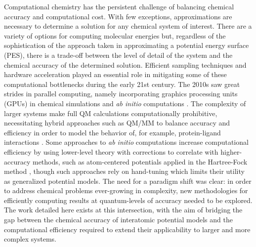 Computational chemistry has the persistent challenge of balancing chemical accuracy and computational cost. 
With few exceptions, approximations are necessary to determine a solution for any chemical system of interest. 
There are a variety of options for computing molecular energies but, regardless of the sophistication of the approach taken in approximating a potential energy surface (PES), there is a trade-off between the level of detail of the system and the chemical accuracy of the determined solution.
Efficient sampling techniques \cite{remd_adrian1, remd_adrian2, remd_umbrella} 
and hardware acceleration \cite{gpu_dft, gpu_quantum_chem1, gpu_quantum_chem2} 
played an essential role in mitigating some of these computational bottlenecks during the early 21st century.
The 2010s saw great strides in parallel computing, namely incorporating graphics processing units (GPUs) in chemical simulations \cite{ gpu_accelerated_AMBER, gpu_accelerated_AMBER18}
and \textit{ab initio} computations \cite{parallel_ab_initio_luehr}. 
The  complexity of larger systems make full QM calculations computationally prohibitive, necessitating hybrid approaches such as QM/MM to balance accuracy and efficiency in order to model the behavior of, for example, protein-ligand interactions \cite{dft_qm_mm_roitberg, QMtoMM_thermo_cycle}.
Some approaches to \textit{ab initio} computations increase computational efficiency by using lower-level theory with corrections to correlate with higher-accuracy methods, such as atom-centered potentials applied in the Hartree-Fock method \cite{correcting_HF_atom_centered_potentials}, though such approaches rely on hand-tuning which limits their utility as generalized potential models.
The need for a paradigm shift was clear: in order to address chemical problems ever-growing in complexity, new methodologies for efficiently computing results at quantum-levels of accuracy needed to be explored.
The work detailed here exists at this intersection, with the aim of bridging the gap between the chemical accuracy of interatomic potential models and the computational efficiency required to extend their applicability to larger and more complex systems. 

